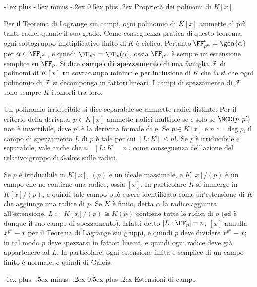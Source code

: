 \documentclass[10pt,landscape]{article}
\makeatletter
\renewcommand{\section}{\@startsection{section}{1}{0mm}%
	{-1ex plus -.5ex minus -.2ex}%
	{0.5ex plus .2ex}%
	{\normalfont\large\bfseries}}
\makeatother
\begin{document}
\begin{multicols}{3}
		\section{Proprietà dei polinomi di $K[x]$}
		
		Per il Teorema di Lagrange sui campi, ogni polinomio
		di $K[x]$ ammette al più tante radici quante il suo grado.
		Come conseguenza pratica di questo teorema, ogni sottogruppo
		moltiplicativo finito di $K$ è ciclico. Pertanto
		$\FF_{p^n}^* = \gen{\alpha}$ per $\alpha \in \FF_{p^n}$,
		e quindi $\FF_{p^n} = \FF_p(\alpha)$, ossia
		$\FF_{p^n}$ è sempre un'estensione semplice su $\FF_p$. Si dice
		\textbf{campo di spezzamento} di una famiglia $\mathcal{F}$
		di polinomi di $K[x]$ un sovracampo minimale per
		inclusione di $K$ che fa sì che ogni polinomio di $\mathcal{F}$ si decomponga in fattori lineari. I campi
		di spezzamento di $\mathcal{F}$ sono sempre
		$K$-isomorfi tra loro. \medskip
		
		
		Un polinomio irriducibile si dice separabile se ammette
		radici distinte. Per il criterio della derivata,
		$p \in K[x]$ ammette radici multiple se e solo se
		$\MCD(p, p')$ non è invertibile, dove $p'$ è la derivata
		formale di $p$. Se $p \in K[x]$ e $n := \deg p$, il campo di spezzamento $L$ di $p$ è tale per cui
		$[L : K] \leq n!$. Se $p$ è irriducibile e separabile, vale anche che $n \mid [L : K] \mid n!$, come
		conseguenza dell'azione del relativo gruppo di
		Galois sulle radici. \medskip
		
		
		Se $p$ è irriducibile in $K[x]$, $(p)$ è un ideale
		massimale, e $K[x] / (p)$ è un campo che
		ne contiene una radice, ossia $[x]$. In
		particolare $K$ si immerge in $K[x] / (p)$,
		e quindi tale campo può essere identificato come
		un'estensione di $K$ che aggiunge una radice di $p$.
		Se $K$ è finito, detta $\alpha$ la radice aggiunta
		all'estensione, $L := K[x] / (p) \cong K(\alpha)$ contiene
		tutte le radici di $p$ (ed è dunque il suo campo
		di spezzamento). Infatti detto $[L : \FF_p] = n$,
		$[x]$ annulla $x^{p^n}-x$ per il Teorema di Lagrange
		sui gruppi, e quindi $p$ deve dividere $x^{p^n}-x$;
		in tal modo $p$ deve spezzarsi in fattori lineari,
		e quindi ogni radice deve già appartenere ad $L$.
		In particolare, ogni estensione finita e semplice
		di un campo finito è normale, e quindi di Galois. \medskip
		
		\section{Estensioni di campo}
		

\end{multicols}
\end{document}
